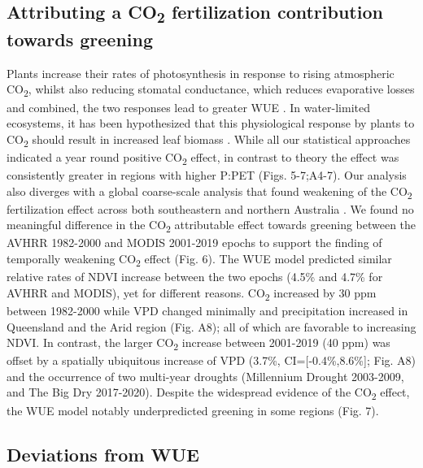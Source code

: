 \documentclass[gc, manuscript]{copernicus}
\begin{document}
\subsection{\texorpdfstring{Attributing a CO\textsubscript{2}
fertilization contribution towards
greening}{Attributing a CO2 fertilization contribution towards greening}}

Plants increase their rates of photosynthesis in response to rising
atmospheric CO\textsubscript{2}, whilst also reducing stomatal
conductance, which reduces evaporative losses and combined, the two
responses lead to greater WUE
\citep{ainsworthResponsePhotosynthesisStomatal2007, morisonSensitivityStomataWater1985}.
In water-limited ecosystems, it has been hypothesized that this
physiological response by plants to CO\textsubscript{2} should result in
increased leaf biomass
\citep{donohueImpactCOFertilization2013b, ukkolaReducedStreamflowWaterstressed2016b}.
While all our statistical approaches indicated a year round positive
CO\textsubscript{2} effect, in contrast to theory the effect was
consistently greater in regions with higher P:PET (Figs. 5-7;A4-7). Our
analysis also diverges with a global coarse-scale analysis that found
weakening of the CO\textsubscript{2} fertilization effect across both
southeastern and northern Australia \citep{wangRecentGlobalDecline2020}.
We found no meaningful difference in the CO\textsubscript{2}
attributable effect towards greening between the AVHRR 1982-2000 and
MODIS 2001-2019 epochs to support the finding of temporally weakening
CO\textsubscript{2} effect (Fig. 6). The WUE model predicted similar
relative rates of NDVI increase between the two epochs (4.5\% and 4.7\%
for AVHRR and MODIS), yet for different reasons. CO\textsubscript{2}
increased by 30 ppm between 1982-2000 while VPD changed minimally and
precipitation increased in Queensland and the Arid region (Fig. A8); all
of which are favorable to increasing NDVI. In contrast, the larger
CO\textsubscript{2} increase between 2001-2019 (40 ppm) was offset by a
spatially ubiquitous increase of VPD (3.7\%, CI={[}-0.4\%,8.6\%{]}; Fig.
A8) and the occurrence of two multi-year droughts (Millennium Drought
2003-2009, and The Big Dry 2017-2020). Despite the widespread evidence
of the CO\textsubscript{2} effect, the WUE model notably underpredicted
greening in some regions (Fig. 7).

\subsection{Deviations from WUE}
\end{document}
